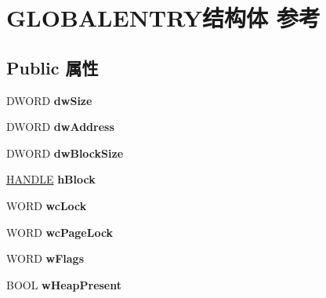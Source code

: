 \hypertarget{struct_g_l_o_b_a_l_e_n_t_r_y}{}\section{G\+L\+O\+B\+A\+L\+E\+N\+T\+R\+Y结构体 参考}
\label{struct_g_l_o_b_a_l_e_n_t_r_y}
\subsection*{Public 属性}
\begin{DoxyCompactItemize}
\item 
\mbox{\label{struct_g_l_o_b_a_l_e_n_t_r_y_a5b7ad2a1e737a788c843c73709be7b15}} 
D\+W\+O\+RD {\bfseries dw\+Size}
\item 
\mbox{\label{struct_g_l_o_b_a_l_e_n_t_r_y_a325cd0fd916d799c7e155dc41d8e2ce1}} 
D\+W\+O\+RD {\bfseries dw\+Address}
\item 
\mbox{\label{struct_g_l_o_b_a_l_e_n_t_r_y_a59df20cd07f2b109650d7793fa25ecda}} 
D\+W\+O\+RD {\bfseries dw\+Block\+Size}
\item 
\mbox{\label{struct_g_l_o_b_a_l_e_n_t_r_y_a91bf9b1c2aa3069e786457f828983d25}} 
\hyperlink{interfacevoid}{H\+A\+N\+D\+LE} {\bfseries h\+Block}
\item 
\mbox{\label{struct_g_l_o_b_a_l_e_n_t_r_y_a282362ef1da9ddf7137433812741dd5a}} 
W\+O\+RD {\bfseries wc\+Lock}
\item 
\mbox{\label{struct_g_l_o_b_a_l_e_n_t_r_y_aa5fcd1c3be484451a44903d0c7023196}} 
W\+O\+RD {\bfseries wc\+Page\+Lock}
\item 
\mbox{\label{struct_g_l_o_b_a_l_e_n_t_r_y_afa9ba8eef6fed887c2601363d362a876}} 
W\+O\+RD {\bfseries w\+Flags}
\item 
\mbox{\label{struct_g_l_o_b_a_l_e_n_t_r_y_a01ddfc01c6de2be4ee1ad68dae6aa50d}} 
B\+O\+OL {\bfseries w\+Heap\+Present}
\item 
\mbox{\label{struct_g_l_o_b_a_l_e_n_t_r_y_a61819d609c854bd985eea744554d8486}} 

\end{DoxyCompactItemize}
